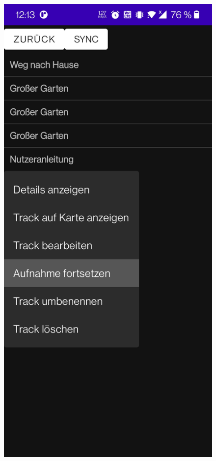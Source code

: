 \documentclass{article}
\begin{document}
	\begin{figure}[H]
		\captionsetup{justification=centering}
		  \includegraphics[width=\linewidth]{8_fortsetzen.jpg}

\end{figure}
\end{document}
